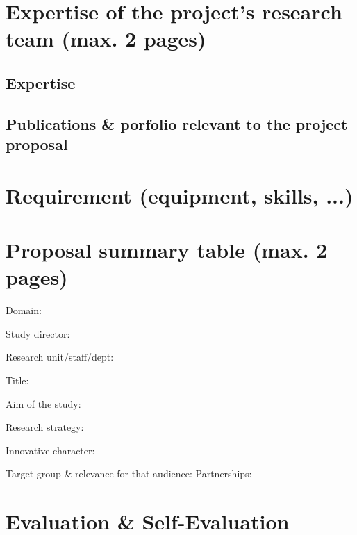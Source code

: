 \section{Expertise of the project's research team (max. 2 pages)}
\subsection{Expertise}
\subsection{Publications \& porfolio relevant to the project proposal}

\section{Requirement (equipment, skills, ...)}

\section{Proposal summary table (max. 2 pages)}
Domain:

Study director:

Research unit/staff/dept:

Title:

Aim of the study:

Research strategy:

Innovative character:

Target group \& relevance for that audience:
Partnerships:

\section{Evaluation \& Self-Evaluation}
